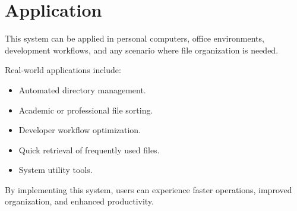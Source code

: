 \documentclass[12pt]{report}
\begin{document}
\section{Application}
This system can be applied in personal computers, office environments, development workflows, and any scenario where file organization is needed.

Real-world applications include:
\begin{itemize}
    \item Automated directory management.
    \item Academic or professional file sorting.
    \item Developer workflow optimization.
    \item Quick retrieval of frequently used files.
    \item System utility tools.
\end{itemize}
By implementing this system, users can experience faster operations, improved organization, and enhanced productivity.

\end{document}
